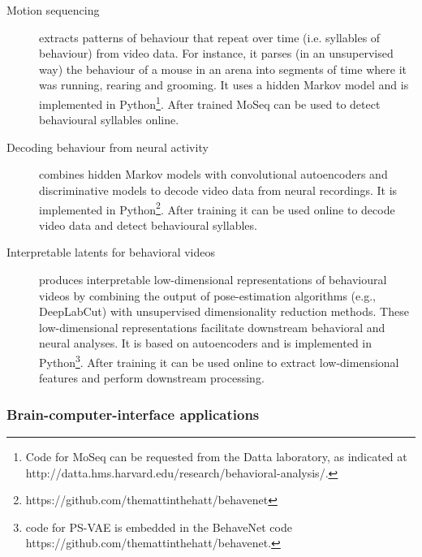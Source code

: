 \begin{description}

    \item[Motion sequencing]\citep[MoSeq;][]{wiltschkoEtAl15} extracts patterns
        of behaviour that repeat over time (i.e. syllables of behaviour) from
        video data. For instance, it parses (in an unsupervised way) the
        behaviour of a mouse in an arena into segments of time where it        was running, rearing and grooming. It uses a hidden Markov model and
        is implemented in Python\footnote{Code for MoSeq can be requested from
        the Datta laboratory, as indicated at
        http://datta.hms.harvard.edu/research/behavioral-analysis/.}.
        After trained MoSeq can be used to detect behavioural syllables online.

    \item[Decoding behaviour from neural
        activity]\citep[BehaveNet;][]{battyEtAl19} combines hidden Markov
        models with convolutional autoencoders and discriminative models to
        decode video data from neural recordings. It is implemented in
        Python\footnote{https://github.com/themattinthehatt/behavenet}.
        After training it can be used online to decode video data and detect
        behavioural syllables.

    \item[Interpretable latents for behavioral videos]\citep[Partitioned
        Subspace Variational Autoencoder, PS-VAE;][]{whitewayEtAl21} produces
        interpretable low-dimensional representations of behavioural videos by
        combining the output of pose-estimation algorithms (e.g., DeepLabCut)
        with unsupervised dimensionality reduction methods. These
        low-dimensional representations facilitate downstream behavioral and
        neural analyses. It is based on autoencoders and is implemented in
        Python\footnote{code for PS-VAE is embedded in the BehaveNet code
        https://github.com/themattinthehatt/behavenet.%
        }. After training it can be used
        online to extract low-dimensional features and perform downstream
        processing.

\end{description}

\subsubsection{Brain-computer-interface applications}
\label{sec:bci}

